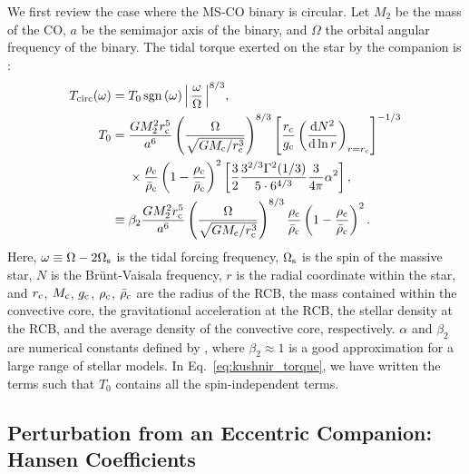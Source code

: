 \documentclass[
        fleqn,
        usenatbib,
    ]{mnras}
\newcommand*{\rd}[2]{\frac{\mathrm{d}#1}{\mathrm{d}#2}}
\newcommand*{\p}[1]{\left(#1\right)}
\newcommand*{\s}[1]{\left[#1\right]}
\DeclareMathOperator*{\sgn}{sgn}
\begin{document}
We first review the case where the MS-CO binary is circular. Let $M_2$ be the
mass of the CO, $a$ be the semimajor axis of the binary, and $\Omega$ the
orbital angular frequency of the binary. The tidal torque exerted on the star by
the companion is \citep{kushnir}:
\begin{align}
    T_{\rm circ}(\omega) ={}& T_0 \sgn\p{\omega}
        \Big|\,\frac{\omega}{\Omega}\,\Big|^{8/3} \label{eq:kushnir_torque},\\
    T_0 ={}& \frac{GM_2^2r_{\rm c}^5}{a^6}
        \p{\frac{\Omega}{\sqrt{GM_{\rm c}/r_{\rm c}^3}}}^{8/3}
        \s{\frac{r_{\rm c}}{g_{\rm c}}
            \p{\rd{N^2}{\ln r}}_{r = r_{\rm c}}}^{-1/3}\nonumber\\
            &\times \frac{\rho_{\rm c}}{\bar{\rho}_{\rm c}}
                \p{1 - \frac{\rho_{\rm c}}{\bar{\rho}_{\rm c}}}^2
                \s{\frac{3}{2}\frac{3^{2/3}\Gamma^2(1/3)}{5 \cdot
                6^{4/3}} \frac{3}{4\pi}\alpha^2},\nonumber\\
        \equiv{}& \beta_2\frac{GM_2^2r_{\rm c}^5}{a^6}
            \p{\frac{\Omega}{\sqrt{GM_{\rm c}/r_{\rm c}^3}}}^{8/3}
            \frac{\rho_{\rm c}}{\bar{\rho}_{\rm c}} \p{1 - \frac{\rho_{\rm
            c}}{\bar{\rho}_{\rm c}}}^2.
\end{align}
Here, $\omega \equiv \Omega - 2\Omega_{\rm s}$ is the tidal forcing frequency,
$\Omega_{\rm s}$ is the spin of the massive star, $N$ is the Br\"unt-Vaisala
frequency, $r$ is the radial coordinate within the star, and $r_{\rm c}$,
$M_{\rm c}$, $g_{\rm c}$, $\rho_{\rm c}$, $\bar{\rho}_{\rm c}$ are the radius of
the RCB, the mass contained within the convective core, the gravitational
acceleration at the RCB, the stellar density at the RCB, and the average density
of the convective core, respectively. $\alpha$ and $\beta_2$ are numerical
constants defined by \citet{kushnir}, where $\beta_2 \approx 1$ is a good
approximation for a large range of stellar models. In
Eq.~\eqref{eq:kushnir_torque}, we have written the terms such that $T_0$
contains all the spin-independent terms.

\subsection{Perturbation from an Eccentric Companion: Hansen Coefficients}
\end{document}

